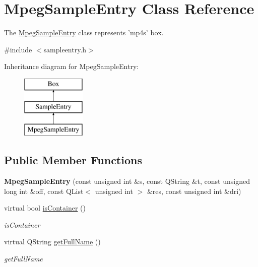 \hypertarget{class_mpeg_sample_entry}{\section{Mpeg\-Sample\-Entry Class Reference}
\label{class_mpeg_sample_entry}
}


The \hyperlink{class_mpeg_sample_entry}{Mpeg\-Sample\-Entry} class represents 'mp4s' box.  




{\ttfamily \#include $<$sampleentry.\-h$>$}

Inheritance diagram for Mpeg\-Sample\-Entry\-:\begin{figure}[H]
\begin{center}
\leavevmode
\includegraphics[height=3.000000cm]{class_mpeg_sample_entry}
\end{center}
\end{figure}
\subsection*{Public Member Functions}
\begin{DoxyCompactItemize}
\item 
\hypertarget{class_mpeg_sample_entry_a34a929d5f793e6dd82cf2f92c73c3964}{{\bfseries Mpeg\-Sample\-Entry} (const unsigned int \&s, const Q\-String \&t, const unsigned long int \&off, const Q\-List$<$ unsigned int $>$ \&res, const unsigned int \&dri)}\label{class_mpeg_sample_entry_a34a929d5f793e6dd82cf2f92c73c3964}

\item 
virtual bool \hyperlink{class_mpeg_sample_entry_a264a9e2915c1a17f5c7e4ff7f59dab47}{is\-Container} ()
\begin{DoxyCompactList}\small\item\em is\-Container \end{DoxyCompactList}\item 
virtual Q\-String \hyperlink{class_mpeg_sample_entry_ac07fbe3d0f06f9360acd2e60eb839928}{get\-Full\-Name} ()
\begin{DoxyCompactList}\small\item\em get\-Full\-Name \end{DoxyCompactList}\end{DoxyCompactItemize}

